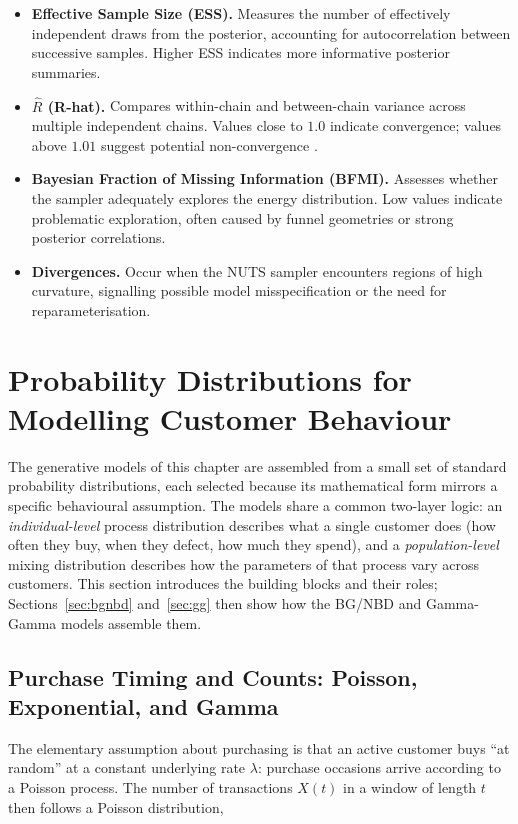 \documentclass[12pt, a4paper, oneside]{report}
\begin{document}
\begin{itemize}
  \item \textbf{Effective Sample Size (ESS).} Measures the number of effectively independent draws from the posterior, accounting for autocorrelation between successive samples. Higher ESS indicates more informative posterior summaries.
  \item \textbf{$\widehat{R}$ (R-hat).} Compares within-chain and between-chain variance across multiple independent chains. Values close to $1.0$ indicate convergence; values above $1.01$ suggest potential non-convergence \parencite{vehtari2021}.
  \item \textbf{Bayesian Fraction of Missing Information (BFMI).} Assesses whether the sampler adequately explores the energy distribution. Low values indicate problematic exploration, often caused by funnel geometries or strong posterior correlations.
  \item \textbf{Divergences.} Occur when the NUTS sampler encounters regions of high curvature, signalling possible model misspecification or the need for reparameterisation.
\end{itemize}

\section{Probability Distributions for Modelling Customer Behaviour}
\label{sec:distributions}

The generative models of this chapter are assembled from a small set of standard probability distributions, each selected because its mathematical form mirrors a specific behavioural assumption. The models share a common two-layer logic: an \emph{individual-level} process distribution describes what a single customer does (how often they buy, when they defect, how much they spend), and a \emph{population-level} mixing distribution describes how the parameters of that process vary across customers. This section introduces the building blocks and their roles; Sections~\ref{sec:bgnbd} and~\ref{sec:gg} then show how the BG/NBD and Gamma-Gamma models assemble them.

\subsection{Purchase Timing and Counts: Poisson, Exponential, and Gamma}
\label{sec:dist-counts}

The elementary assumption about purchasing is that an active customer buys ``at random'' at a constant underlying rate $\lambda$: purchase occasions arrive according to a Poisson process. The number of transactions $X(t)$ in a window of length $t$ then follows a Poisson distribution,
\end{document}
